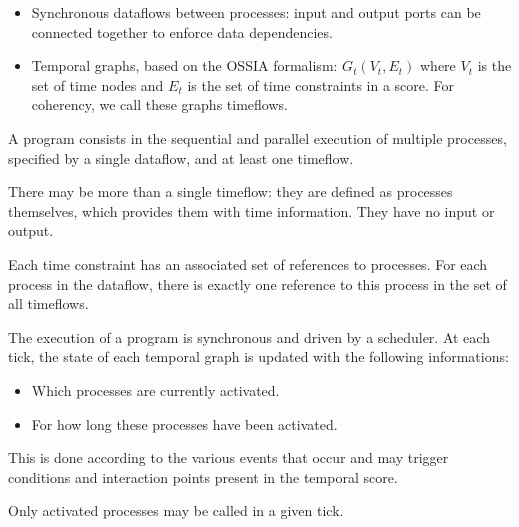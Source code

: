 \documentclass{article}
\begin{document}
    \begin{itemize}
        \item Synchronous dataflows between processes: input and output ports can be connected together to enforce data dependencies.
        \item Temporal graphs, based on the OSSIA formalism: $G_t(V_t, E_t)$ where $V_t$ is the set of time nodes and $E_t$ is the set of time constraints in a score. 
        For coherency, we call these graphs timeflows.
    \end{itemize}

    A program consists in the sequential and parallel execution of multiple processes, specified by a single dataflow, and at least one timeflow.
    
    There may be more than a single timeflow: they are defined as processes themselves, which provides them with time information.
    They have no input or output.
    
    Each time constraint has an associated set of references to processes.
    For each process in the dataflow, there is exactly one reference to this process in the set of all timeflows.
    
    The execution of a program is synchronous and driven by a scheduler.
    At each tick, the state of each temporal graph is updated with the following informations:
    
    \begin{itemize}
        \item Which processes are currently activated.
        \item For how long these processes have been activated.
    \end{itemize}

    This is done according to the various events that occur and may trigger conditions and interaction points present in the temporal score.
    
    Only activated processes may be called in a given tick.
    
    
\end{document}
